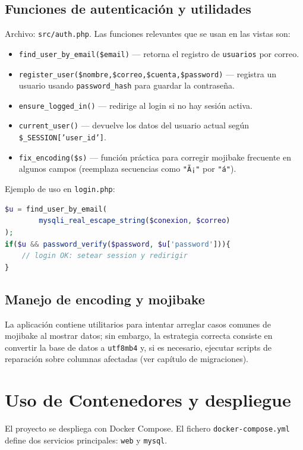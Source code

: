 \documentclass[12pt,letterpaper,oneside]{extreport}
\begin{document}
\section{Funciones de autenticación y utilidades}
Archivo: \texttt{src/auth.php}. Las funciones relevantes que se usan en las vistas son:
\begin{itemize}
    \item \texttt{find\_user\_by\_email(\$email)} — retorna el registro de \texttt{usuarios} por correo.
    \item \texttt{register\_user(\$nombre,\$correo,\$cuenta,\$password)} — registra un usuario usando \texttt{password\_hash} para guardar la contraseña.
    \item \texttt{ensure\_logged\_in()} — redirige al login si no hay sesión activa.
    \item \texttt{current\_user()} — devuelve los datos del usuario actual según \texttt{\$_SESSION['user\_id']}.
    \item \texttt{fix\_encoding(\$s)} — función práctica para corregir mojibake frecuente en algunos campos (reemplaza secuencias como \texttt{"Ã¡"} por \texttt{"á"}).
\end{itemize}

Ejemplo de uso en \texttt{login.php}:
\begin{lstlisting}[language=PHP]
$u = find_user_by_email(
        mysqli_real_escape_string($conexion, $correo)
);
if($u && password_verify($password, $u['password'])){
    // login OK: setear session y redirigir
}
\end{lstlisting}

\section{Manejo de encoding y mojibake}
La aplicación contiene utilitarios para intentar arreglar casos comunes de mojibake al mostrar datos; sin embargo, la estrategia correcta consiste en convertir la base de datos a \texttt{utf8mb4} y, si es necesario, ejecutar scripts de reparación sobre columnas afectadas (ver capítulo de migraciones).

\chapter{Uso de Contenedores y despliegue}
El proyecto se despliega con Docker Compose. El fichero \texttt{docker-compose.yml} define dos servicios principales: \texttt{web} y \texttt{mysql}.
\end{document}
